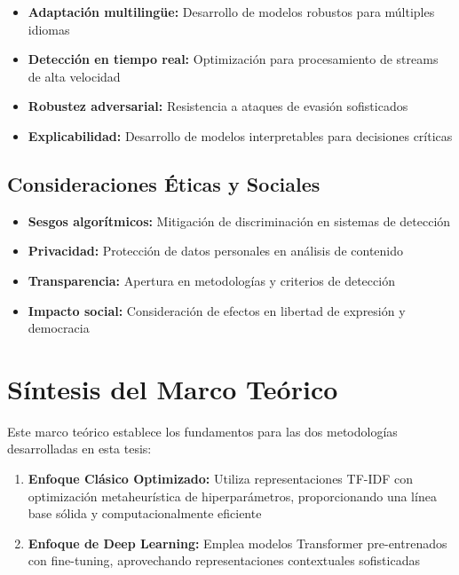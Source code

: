 \begin{itemize}
    \item \textbf{Adaptación multilingüe:} Desarrollo de modelos robustos para múltiples idiomas
    \item \textbf{Detección en tiempo real:} Optimización para procesamiento de streams de alta velocidad
    \item \textbf{Robustez adversarial:} Resistencia a ataques de evasión sofisticados
    \item \textbf{Explicabilidad:} Desarrollo de modelos interpretables para decisiones críticas
\end{itemize}

\subsection{Consideraciones Éticas y Sociales}

\begin{itemize}
    \item \textbf{Sesgos algorítmicos:} Mitigación de discriminación en sistemas de detección
    \item \textbf{Privacidad:} Protección de datos personales en análisis de contenido
    \item \textbf{Transparencia:} Apertura en metodologías y criterios de detección
    \item \textbf{Impacto social:} Consideración de efectos en libertad de expresión y democracia
\end{itemize}

\section{Síntesis del Marco Teórico}
\label{sec:sintesis_marco}

Este marco teórico establece los fundamentos para las dos metodologías desarrolladas en esta tesis:

\begin{enumerate}
    \item \textbf{Enfoque Clásico Optimizado:} Utiliza representaciones TF-IDF con optimización metaheurística de hiperparámetros, proporcionando una línea base sólida y computacionalmente eficiente
    
    \item \textbf{Enfoque de Deep Learning:} Emplea modelos Transformer pre-entrenados con fine-tuning, aprovechando representaciones contextuales sofisticadas
\end{enumerate}

